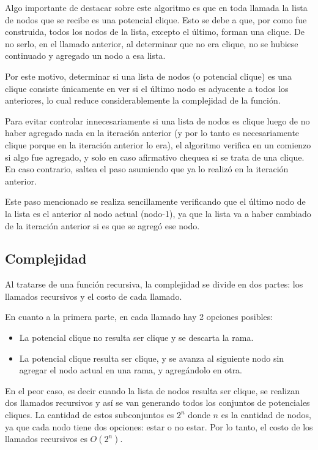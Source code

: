 Algo importante de destacar sobre este algoritmo es que en toda llamada la lista de nodos que se recibe es una potencial clique. Esto se debe a que, por como fue construida, todos los nodos de la lista, excepto el último, forman una clique. De no serlo, en el llamado anterior, al determinar que no era clique, no se hubiese continuado y agregado un nodo a esa lista.

Por este motivo, determinar si una lista de nodos (o potencial clique) es una clique consiste únicamente en ver si el último nodo es adyacente a todos los anteriores, lo cual reduce considerablemente la complejidad de la función.

Para evitar controlar innecesariamente si una lista de nodos es clique luego de no haber agregado nada en la iteración anterior (y por lo tanto es necesariamente clique porque en la iteración anterior lo era), el algoritmo verifica en un comienzo si algo fue agregado, y solo en caso afirmativo chequea si se trata de una clique. En caso contrario, saltea el paso asumiendo que ya lo realizó en la iteración anterior.

Este paso mencionado se realiza sencillamente verificando que el último nodo de la lista es el anterior al nodo actual (nodo-1), ya que la lista va a haber cambiado de la iteración anterior si es que se agregó ese nodo.


\subsection{Complejidad}

Al tratarse de una función recursiva, la complejidad se divide en dos partes: los llamados recursivos y el costo de cada llamado.

En cuanto a la primera parte, en cada llamado hay 2 opciones posibles:

\begin{itemize}
\item La potencial clique no resulta ser clique y se descarta la rama.
\item La potencial clique resulta ser clique, y se avanza al siguiente nodo sin agregar el nodo actual en una rama, y agregándolo en otra.
\end{itemize}

En el peor caso, es decir cuando la lista de nodos resulta ser clique, se realizan dos llamados recursivos y así se van generando todos los conjuntos de potenciales cliques. La cantidad de estos subconjuntos es $2^n$ donde $n$ es la cantidad de nodos, ya que cada nodo tiene dos opciones: estar o no estar. Por lo tanto, el costo de los llamados recursivos es $O(2^n)$.

